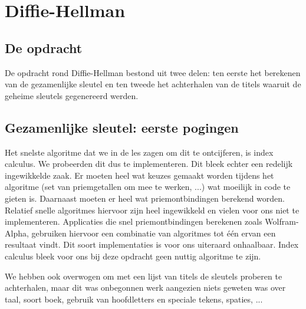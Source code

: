 \section{Diffie-Hellman}
\subsection{De opdracht}
De opdracht rond Diffie-Hellman bestond uit twee delen: ten eerste het berekenen van de gezamenlijke sleutel en ten tweede het achterhalen van de titels waaruit de geheime sleutels gegenereerd werden.

\subsection{Gezamenlijke sleutel: eerste pogingen}
Het snelste algoritme dat we in de les zagen om dit te ontcijferen, is index calculus. We probeerden dit dus te implementeren. Dit bleek echter een redelijk ingewikkelde zaak. Er moeten heel wat keuzes gemaakt worden tijdens het algoritme (set van priemgetallen om mee te werken, ...) wat moeilijk in code te gieten is. Daarnaast moeten er heel wat priemontbindingen berekend worden. Relatief snelle algoritmes hiervoor zijn heel ingewikkeld en vielen voor ons niet te implementeren. Applicaties die snel priemontbindingen berekenen zoals Wolfram-Alpha, gebruiken hiervoor een combinatie van algoritmes tot \'e\'en ervan een resultaat vindt. Dit soort implementaties is voor ons uiteraard onhaalbaar. Index calculus bleek voor ons bij deze opdracht geen nuttig algoritme te zijn.

We hebben ook overwogen om met een lijst van titels de sleutels proberen te achterhalen, maar dit was onbegonnen werk aangezien niets geweten was over taal, soort boek, gebruik van hoofdletters en speciale tekens, spaties, ...

